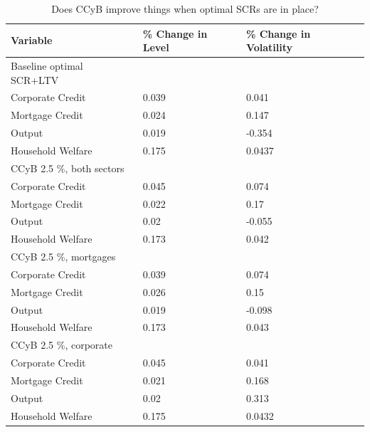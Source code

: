 \documentclass[12pt]{article}
\numberwithin{equation}{section}
\begin{document}
\begin{table}[h]
\label{counterfact_CCyB_table}
\caption{Does CCyB improve things when optimal SCRs are in place?}
\begin{tabular}{l|l|l}
\small
Variable & \% Change in Level & \% Change in Volatility \\
\hline
Baseline optimal SCR+LTV & & \\
\hline
    Corporate Credit           &       0.039    &      0.041 \\
    Mortgage Credit            &      0.024    &       0.147 \\
    Output         &     0.019    &    -0.354 \\ 
    Household Welfare       &     0.175     &     0.0437\\
\hline
CCyB 2.5 \%, both sectors & & \\
\hline
    Corporate Credit           &       0.045    &     0.074 \\
    Mortgage Credit            &      0.022    &      0.17 \\
    Output         				&     0.02    &    -0.055 \\ 
    Household Welfare       &     0.173     &     0.042\\
\hline
CCyB 2.5 \%, mortgages  & & \\
\hline
    Corporate Credit           &       0.039    &     0.074 \\
    Mortgage Credit            &      0.026    &      0.15 \\
    Output         				&     0.019    &    -0.098 \\ 
    Household Welfare       &     0.173     &     0.043\\
 \hline
CCyB 2.5 \%, corporate  & & \\
\hline
    Corporate Credit           &       0.045    &     0.041 \\
    Mortgage Credit            &      0.021    &      0.168 \\
    Output         				&     0.02    &    0.313 \\ 
    Household Welfare       &     0.175     &     0.0432\\   

\end{tabular}
\end{table}
\end{document}
